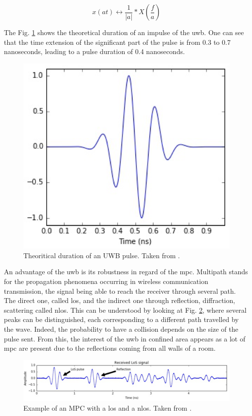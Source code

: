 \begin{equation}
	x(at) \longleftrightarrow \frac{1}{|a|}*X(\frac{f}{a})
\label{fig:eq}
\end{equation}

The Fig. \ref{fig:UWB_time} shows the theoretical duration of an impulse of the \gls{uwb}. One can see that the time extension of the significant part of the pulse is from 0.3 to 0.7 nanoseconds, leading to a pulse duration of 0.4 nanoseconds.

\begin{figure}[H]
\centering
\includegraphics[width=.4\linewidth]{Images/uwb_pulse.png}
\caption{Theoritical duration of an UWB pulse. Taken from \cite{defraye2017determining}.}
\label{fig:UWB_time}
\end{figure}

An advantage of the \gls{uwb} is its robustness in regard of the \gls{mpc}. Multipath stands for the propagation phenomena occurring in wireless communication transmission, the signal being able to reach the receiver through several path. The direct one, called \gls{los}, and the indirect one through reflection, diffraction, scattering called \gls{nlos}.  This can be understood by looking at Fig. \ref{fig:UWB_MPC_Theo}, where several peaks can be distinguished, each corresponding to a different path travelled by the wave. Indeed, the probability to have a collision depends on the size of the pulse sent. From this, the interest of the \gls{uwb} in confined area appears as a lot of \gls{mpc} are present due to the reflections coming from all walls of a room.

\begin{figure}[H]
\centering
\includegraphics[width=.9\linewidth]{Images/mpc_pulses.png}
\caption{Example of an MPC with a \gls{los} and a \gls{nlos}. Taken from \cite{defraye2017determining}.}
\label{fig:UWB_MPC_Theo}
\end{figure}

